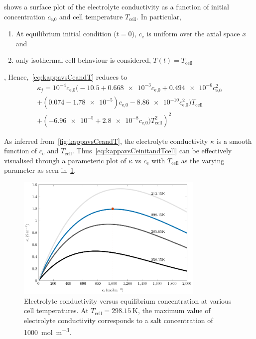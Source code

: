  shows  a surface  plot of the  electrolyte conductivity
as  a function  of  initial concentration  $c_\text{e,0}$  and cell  temperature
$T_\text{cell}$. In particular,
\begin{enumerate}%
    \item At  equilibrium  initial condition ($t=0$), $c_\text{e}$ is uniform over the axial space $x$ and
    \item only isothermal cell behaviour is considered, \ie{} $T(t) = T_\text{cell}$
\end{enumerate},
Hence,~\cref{eq:kappavsCeandT} reduces to
\begin{multline}\label{eq:kappavsCeinitandTcell}
    \kappa_j =  10^{-4} c_\text{e,0} \bigl(-10.5 + \num{0.668e-3} c_\text{e,0} + \num{0.494e-6}  c_\text{e,0}^2\\
        + (0.074 - \num{1.78e-5}) c_\text{e,0} - \num{8.86e-10}
    c_\text{e,0}^2 \bigr)T_\text{cell}\\
	+ \left(\num{-6.96e-5} + \num{2.8e-8} c_\text{e,0})T_\text{cell}^2\right)^2
\end{multline}

As   inferred   from~\cref{fig:kappavsCeandT},  the   electrolyte   conductivity
$\kappa$   is   a  smooth   function   of   $c_\text{e}$  and   $T_\text{cell}$.
Thus~\cref{eq:kappavsCeinitandTcell}  can be  effectively  visualised through  a
parameteric plot of $\kappa$ vs $c_\text{e}$ with $T_\text{cell}$ as the varying
parameter as seen in~\cref{fig:kappavsce}.

\begin{figure}[tb]
    \centering
    \includegraphics[width=0.8\textwidth]{4/figures/m2t_kappa_ce_parametric_T.pdf}
    \caption[]
    {Electrolyte conductivity versus equilibrium concentration at various cell
        temperatures. At ${T_\text{cell} = \SI{298.15}{\kelvin}}$, the maximum
        value of electrolyte conductivity corresponds to a salt concentration of
    \SI{1000}{\mol\per\meter\cubed}.}
    \label{fig:kappavsce}
\end{figure}

